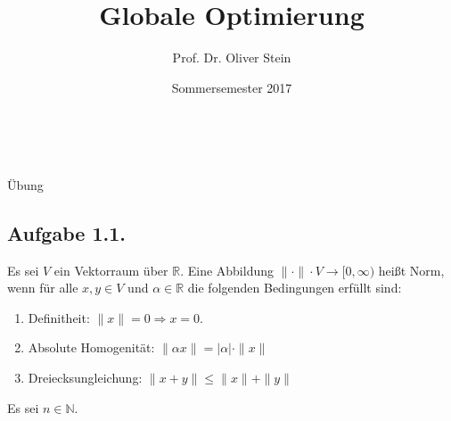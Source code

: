 \documentclass[12pt]{extreport} %
\title{Globale Optimierung}
\author{Prof. Dr. Oliver Stein}
\date{Sommersemester 2017}
\makeatletter
\newcommand{\N}{\mathbb{N}}
\newcommand{\R}{\mathbb{R}}
\theoremstyle{named}
\theoremstyle{nnamed}
\theoremstyle{itshape}
\theoremstyle{normal}
\def\maketitle{ \begin{titlepage} 
			~\vspace{3cm} 
		\begin{center} {\Huge \@title} \end{center} 
		\begin{center} {\LARGE Übung }\end{center}
	 		\vspace*{1cm} 
	 	\begin{center} {\large \@author} \end{center} 
	 	\begin{center} \@date \end{center} 
	 		\vspace*{7cm} 
	 	\begin{center} \@publishers \end{center} 
	 		\vfill 
	\end{titlepage} }
\makeatother
\begin{document}
\begin{titlepage}
	\maketitle
	\thispagestyle{empty}
\end{titlepage}

	
\subsection*{Aufgabe 1.1.}
Es sei $V$ ein Vektorraum über $\R$. Eine Abbildung $\| \cdot \| \cdot V \rightarrow [0, \infty)$ heißt Norm, wenn für alle $x, y \in V $ und $\alpha \in \R$ die folgenden Bedingungen erfüllt sind:
\begin{enumerate}[label=\arabic*\upshape)]
	\item Definitheit: $\| x \| = 0 \Rightarrow x = 0$.
	\item Absolute Homogenität: $\| \alpha x \| = |\alpha| \cdot \| x \|$
	\item Dreiecksungleichung: $\| x + y\| \leq \| x \| + \| y \|$
\end{enumerate}
Es sei $n \in \N$.
\end{document}
